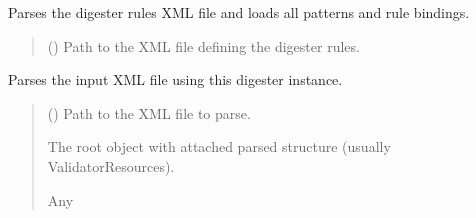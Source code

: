 \documentclass[letterpaper,10pt,english]{sphinxmanual}
\begin{document}
\begin{fulllineitems}
\begin{fulllineitems}
\label{\detokenize{apache_commons_validator_python.util:apache_commons_validator_python.util.digester.Digester.load_rules}}
\pysigstartsignatures
{}
\pysigstopsignatures
\sphinxAtStartPar
Parses the digester rules XML file and loads all patterns and rule bindings.
\begin{quote}\begin{description}
\sphinxAtStartPar
{} () \textendash{} Path to the XML file defining the digester rules.

\end{description}\end{quote}

\end{fulllineitems}


\begin{fulllineitems}
\label{\detokenize{apache_commons_validator_python.util:apache_commons_validator_python.util.digester.Digester.parse}}
\pysigstartsignatures
{}
\pysigstopsignatures
\sphinxAtStartPar
Parses the input XML file using this digester instance.
\begin{quote}\begin{description}
\sphinxAtStartPar
{} () \textendash{} Path to the XML file to parse.

\sphinxAtStartPar
The root object with attached parsed structure (usually ValidatorResources).

\sphinxAtStartPar
Any

\end{description}\end{quote}

\end{fulllineitems}


\end{fulllineitems}
\end{document}
